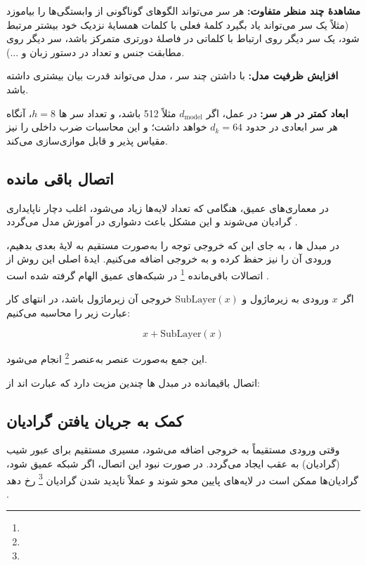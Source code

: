\textbf{مشاهدهٔ چند منظر متفاوت:} هر  سر می‌تواند الگوهای گوناگونی از وابستگی‌ها را بیاموزد (مثلاً یک سر می‌تواند یاد بگیرد کلمهٔ فعلی با کلمات همسایهٔ نزدیک خود بیشتر مرتبط شود، یک سر  دیگر روی ارتباط با کلماتی در فاصلهٔ دورتری متمرکز باشد، سر دیگر روی مطابقت جنس و تعداد در دستور زبان و ...).

\textbf{افزایش ظرفیت مدل:} با داشتن چند سر ، مدل می‌تواند قدرت بیان بیشتری داشته باشد.

\textbf{ابعاد کمتر در هر سر:} در عمل، اگر \( d_{\text{model}} \) مثلاً 512 باشد، و تعداد سر ها \( h = 8 \)، آنگاه هر سر  ابعادی در حدود \( d_k = 64 \) خواهد داشت؛ و این محاسبات ضرب داخلی را نیز مقیاس‌ پذیر و قابل موازی‌سازی می‌کند.


\subsection{اتصال باقی مانده}
در معماری‌های عمیق، هنگامی که تعداد لایه‌ها زیاد می‌شود، اغلب دچار ناپایداری گرادیان می‌شوند و این مشکل باعث دشواری در آموزش مدل می‌گردد \cite{hochreiter1997long,bengio1994learning}. 

در مبدل ها \cite{vaswani2017attention}، به جای این که خروجی توجه را به‌صورت مستقیم به لایهٔ بعدی بدهیم، ورودی آن را نیز حفظ کرده و به خروجی اضافه می‌کنیم. ایدهٔ اصلی این روش از اتصالات باقی‌مانده \footnote{} در شبکه‌های عمیق الهام گرفته شده است \cite{he2016deep}.

اگر \( x \) ورودی به زیرماژول و \( \text{SubLayer}(x) \) خروجی آن زیرماژول باشد، در انتهای کار عبارت زیر را محاسبه می‌کنیم:

\begin{equation}
	x + \text{SubLayer}(x)
	\label{eq:sublayer}
\end{equation}

این جمع به‌صورت عنصر به‌عنصر \footnote{} انجام می‌شود.


اتصال باقیمانده در مبدل ها چندین مزیت دارد که عبارت اند از:

\subsection*{کمک به جریان یافتن گرادیان}
وقتی ورودی مستقیماً به خروجی اضافه می‌شود، مسیری مستقیم برای عبور شیب (گرادیان) به عقب ایجاد می‌گردد.
در صورت نبود این اتصال، اگر شبکه عمیق شود، گرادیان‌ها ممکن است در لایه‌های پایین محو شوند و عملاً ناپدید شدن گرادیان \footnote{} رخ دهد \cite{hochreiter1997long,bengio1994learning}.

